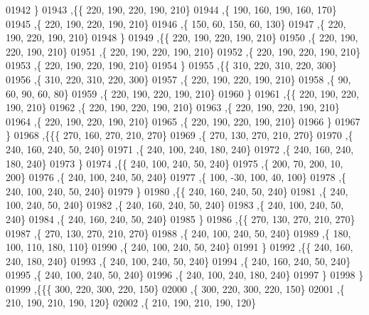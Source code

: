 \begin{DoxyCode}
01942     \}
01943    ,\{\{   220,   190,   220,   190,   210\}
01944     ,\{   190,   160,   190,   160,   170\}
01945     ,\{   220,   190,   220,   190,   210\}
01946     ,\{   150,    60,   150,    60,   130\}
01947     ,\{   220,   190,   220,   190,   210\}
01948     \}
01949    ,\{\{   220,   190,   220,   190,   210\}
01950     ,\{   220,   190,   220,   190,   210\}
01951     ,\{   220,   190,   220,   190,   210\}
01952     ,\{   220,   190,   220,   190,   210\}
01953     ,\{   220,   190,   220,   190,   210\}
01954     \}
01955    ,\{\{   310,   220,   310,   220,   300\}
01956     ,\{   310,   220,   310,   220,   300\}
01957     ,\{   220,   190,   220,   190,   210\}
01958     ,\{    90,    60,    90,    60,    80\}
01959     ,\{   220,   190,   220,   190,   210\}
01960     \}
01961    ,\{\{   220,   190,   220,   190,   210\}
01962     ,\{   220,   190,   220,   190,   210\}
01963     ,\{   220,   190,   220,   190,   210\}
01964     ,\{   220,   190,   220,   190,   210\}
01965     ,\{   220,   190,   220,   190,   210\}
01966     \}
01967    \}
01968   ,\{\{\{   270,   160,   270,   210,   270\}
01969     ,\{   270,   130,   270,   210,   270\}
01970     ,\{   240,   160,   240,    50,   240\}
01971     ,\{   240,   100,   240,   180,   240\}
01972     ,\{   240,   160,   240,   180,   240\}
01973     \}
01974    ,\{\{   240,   100,   240,    50,   240\}
01975     ,\{   200,    70,   200,    10,   200\}
01976     ,\{   240,   100,   240,    50,   240\}
01977     ,\{   100,   -30,   100,    40,   100\}
01978     ,\{   240,   100,   240,    50,   240\}
01979     \}
01980    ,\{\{   240,   160,   240,    50,   240\}
01981     ,\{   240,   100,   240,    50,   240\}
01982     ,\{   240,   160,   240,    50,   240\}
01983     ,\{   240,   100,   240,    50,   240\}
01984     ,\{   240,   160,   240,    50,   240\}
01985     \}
01986    ,\{\{   270,   130,   270,   210,   270\}
01987     ,\{   270,   130,   270,   210,   270\}
01988     ,\{   240,   100,   240,    50,   240\}
01989     ,\{   180,   100,   110,   180,   110\}
01990     ,\{   240,   100,   240,    50,   240\}
01991     \}
01992    ,\{\{   240,   160,   240,   180,   240\}
01993     ,\{   240,   100,   240,    50,   240\}
01994     ,\{   240,   160,   240,    50,   240\}
01995     ,\{   240,   100,   240,    50,   240\}
01996     ,\{   240,   100,   240,   180,   240\}
01997     \}
01998    \}
01999   ,\{\{\{   300,   220,   300,   220,   150\}
02000     ,\{   300,   220,   300,   220,   150\}
02001     ,\{   210,   190,   210,   190,   120\}
02002     ,\{   210,   190,   210,   190,   120\}

\end{DoxyCode}
